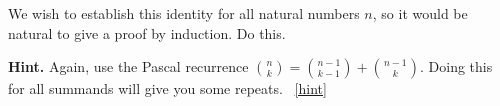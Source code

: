 \documentclass{book}
\begin{document}
\setcounter{project}{77}
\addtocounter{project}{-1}
\begin{activity}[]\label{activity-70}
\hypertarget{p-592}{}%
We wish to establish this identity for all natural numbers \(n\), so it would be natural to give a proof by induction.  Do this.%
\par\smallskip%
\noindent\textbf{Hint.}\hypertarget{hint-33}{}\quad%
\hypertarget{p-593}{}%
Again, use the Pascal recurrence \(\binom{n}{k} = \binom{n-1}{k-1} + \binom{n-1}{k}\).  Doing this for all summands will give you some repeats.%
~\hfill{\tiny\hyperlink{a-77}{[hint]}\hypertarget{q-77}{}}\end{activity}

\clearpage
\end{document}
